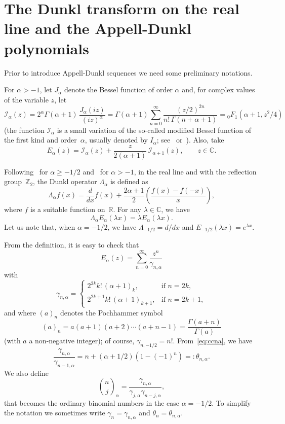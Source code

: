 \documentclass[10pt]{article}
\theoremstyle{plain}
\theoremstyle{definition}
\numberwithin{equation}{section} %
\newcommand{\Ea}{E_{\alpha}}
\newcommand{\La}{\Lambda_{\alpha}}
\newcommand{\binoma}[2]{\binom{#1}{#2}_{\!\alpha}}
\newcommand{\I}{\mathcal{I}}
\newcommand{\RR}{\mathbb{R}}
\newcommand{\ZZ}{\mathbb{Z}}
\newcommand{\CC}{\mathbb{C}}
\newcommand{\cc}{\gamma}
\begin{document}
\section{The Dunkl transform on the real line and the Appell-Dunkl polynomials}
\label{sec:DT-AD}

Prior to introduce Appell-Dunkl sequences we need some preliminary notations.

For $\alpha > -1$, let $J_\alpha$ denote the Bessel function of order $\alpha$ and,
for complex values of the variable $z$, let
\[
  \I_\alpha(z)
  = 2^\alpha \Gamma(\alpha+1)\, \frac{J_\alpha(iz)}{(iz)^\alpha}
  = \Gamma(\alpha+1) \sum_{n=0}^\infty \frac{(z/2)^{2n}}{n!\,\Gamma(n+\alpha+1)}
  = {}_0F_1(\alpha+1,z^2/4)
\]
(the function $\I_\alpha$ is a small variation of the so-called modified Bessel function of the first kind and order~$\alpha$, usually denoted by $I_\alpha$; see~\cite{Wat} or~\cite{OlMa-NIST}).
Also, take %
\[
  \Ea(z) = \I_\alpha(z) + \frac{z}{2(\alpha+1)}\,
  \I_{\alpha+1}(z),
  \qquad z \in \CC.
\]

Following~\cite{Du} for $\alpha\ge-1/2$ and~\cite{Ros} for $\alpha>-1$, in the real line and with the reflection group~$\ZZ_2$, the Dunkl operator $\La$ is defined as
\begin{equation}
\label{eq:Duop}
  \La f(x) = \frac{d}{dx}f(x) + \frac{2\alpha+1}{2}
  \left(\frac{f(x)-f(-x)}{x}\right),
\end{equation}
where $f$ is a suitable function on~$\RR$.
For any $\lambda \in \CC$, we have
\begin{equation}
\label{eq:LDu}
  \La \Ea(\lambda x) = \lambda \Ea(\lambda x).
\end{equation}
Let us note that, when $\alpha = -1/2$, we have $\Lambda_{-1/2} = d/dx$ and $E_{-1/2}(\lambda x) = e^{\lambda x}$.

From the definition, it is easy to check that
\[
  \Ea(z) = \sum_{n=0}^\infty \frac{z^n}{\cc_{n,\alpha}}
\]
with 
\begin{equation}
\label{eq:ccna}
\cc_{n,\alpha} =
\begin{cases} 
  2^{2k}k!\,(\alpha+1)_k, & \text{if $n=2k$},\\
  2^{2k+1}k!\,(\alpha+1)_{k+1}, & \text{if $n=2k+1$},
\end{cases}
\end{equation}
and where $(a)_n$ denotes the Pochhammer symbol
\[
  (a)_n = a(a+1)(a+2) \cdots (a+n-1) = \frac{\Gamma(a+n)}{\Gamma(a)}
\]
(with $a$ a non-negative integer); of course, $\cc_{n,-1/2} = n!$.
From~\eqref{eq:ccna}, we have
\begin{equation}
\label{eq:coccc}
  \frac{\cc_{n,\alpha}}{\cc_{n-1,\alpha}} = n+(\alpha+1/2)(1-(-1)^n) =: \theta_{n,\alpha}.
\end{equation}
We also define
\[
  \binoma{n}{j} = \frac{\cc_{n,\alpha}}{\cc_{j,\alpha}\cc_{n-j,\alpha}},
\]
that becomes the ordinary binomial numbers in the case $\alpha=-1/2$.
To simplify the notation we sometimes write $\cc_n=\cc_{n,\alpha}$ and $\theta_n=\theta_{n,\alpha}$.
\end{document}
